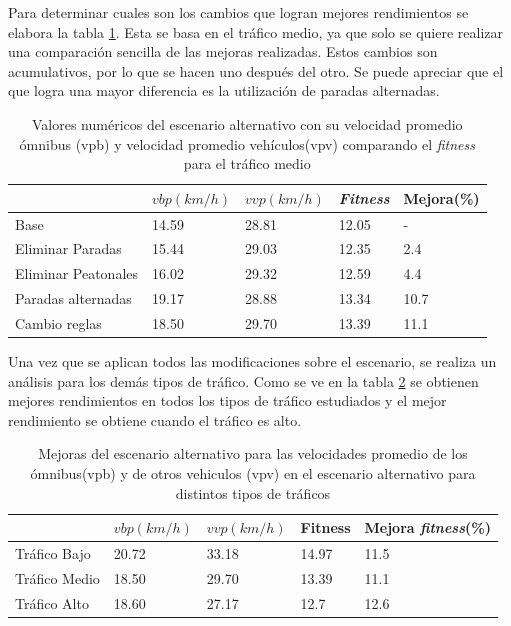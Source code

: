 Para determinar cuales son los cambios que logran mejores rendimientos se elabora la tabla \ref{table:resultado_alternativo}. Esta se basa en el tráfico medio, ya que solo se quiere realizar una comparación sencilla de las mejoras realizadas. Estos cambios son acumulativos, por lo que se hacen uno después del otro. Se puede apreciar que el que logra una mayor diferencia es la utilización de paradas alternadas.


\begin{table}[H]
	\renewcommand{\arraystretch}{1.2}
	\caption[Valores numéricos del escenario alternativo]{Valores numéricos del escenario alternativo con su velocidad promedio ómnibus (vpb) y velocidad promedio vehículos(vpv) comparando el \emph{fitness} para el tráfico medio }
	\label{table:resultado_alternativo}
	\centering
	\begin{tabular}{p{3.5cm}p{2.5cm}p{2.5cm}p{2cm}p{2cm} }
		\hline
		&
		$vbp(km/h)$& 
		$vvp(km/h)$ & 
		\emph{Fitness} &
		Mejora(\%)
		\\ 
		\hline
		Base & 14.59  & 28.81& 12.05 & -\\
		Eliminar Paradas & 15.44  & 29.03& 12.35 & 2.4\\
		Eliminar Peatonales  & 16.02  & 29.32& 12.59 & 4.4\\
		Paradas alternadas  & 19.17  & 28.88& 13.34 & 10.7\\	
		Cambio reglas  & 18.50  & 29.70& 13.39 & 11.1\\				
		\hline
	\end{tabular}
\end{table}

Una vez que se aplican todos las modificaciones sobre el escenario, se realiza un análisis para los demás tipos de tráfico. Como se ve en la tabla \ref{table:mejoras_trafico_alternativo} se obtienen mejores rendimientos en todos los tipos de tráfico estudiados y el mejor rendimiento se obtiene cuando el tráfico es alto. 

\begin{table}[H]
	\renewcommand{\arraystretch}{1.2}
	\caption[Mejoras del escenario alternativo.]{Mejoras del escenario alternativo  para las velocidades promedio de los ómnibus(vpb) y de otros vehiculos (vpv) en el escenario alternativo para distintos tipos de tráficos }
	\label{table:mejoras_trafico_alternativo}
	\centering
	\begin{tabular}{p{3.5cm}p{2.5cm}p{2.5cm}p{2cm}p{2cm} }
		\hline
		&
		$vbp(km/h)$& 
		$vvp(km/h)$ & 
		Fitness &
		Mejora \emph{fitness}(\%)
		\\ 
		\hline

		Tráfico Bajo & 20.72  & 33.18 & 14.97 & 11.5\\
		Tráfico Medio & 18.50  & 29.70& 13.39 & 11.1 \\
		Tráfico Alto  & 18.60  & 27.17& 12.7 & 12.6\\		
		\hline
	\end{tabular}
\end{table}

